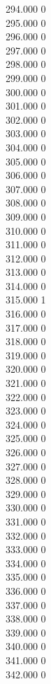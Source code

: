 { 294.000	0 \\
 295.000	0 \\
 296.000	0 \\
 297.000	0 \\
 298.000	0 \\
 299.000	0 \\
 300.000	0 \\
 301.000	0 \\
 302.000	0 \\
 303.000	0 \\
 304.000	0 \\
 305.000	0 \\
 306.000	0 \\
 307.000	0 \\
 308.000	0 \\
 309.000	0 \\
 310.000	0 \\
 311.000	0 \\
 312.000	0 \\
 313.000	0 \\
 314.000	0 \\
 315.000	1 \\
 316.000	0 \\
 317.000	0 \\
 318.000	0 \\
 319.000	0 \\
 320.000	0 \\
 321.000	0 \\
 322.000	0 \\
 323.000	0 \\
 324.000	0 \\
 325.000	0 \\
 326.000	0 \\
 327.000	0 \\
 328.000	0 \\
 329.000	0 \\
 330.000	0 \\
 331.000	0 \\
 332.000	0 \\
 333.000	0 \\
 334.000	0 \\
 335.000	0 \\
 336.000	0 \\
 337.000	0 \\
 338.000	0 \\
 339.000	0 \\
 340.000	0 \\
 341.000	0 \\
 342.000	0 \\
}

